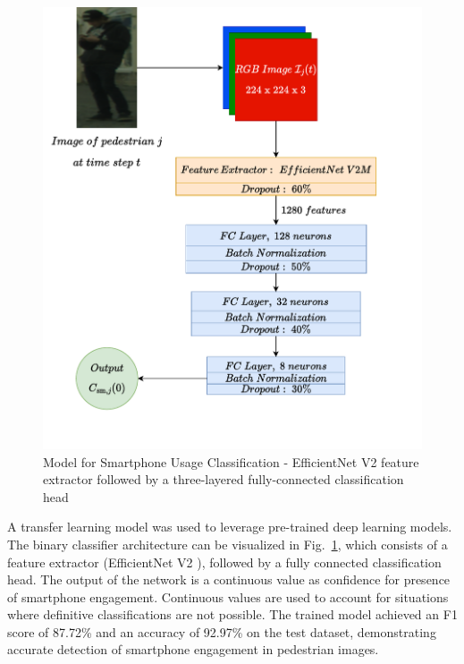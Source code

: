 \documentclass[journal]{IEEEtran}
\begin{document}
\begin{figure}
  \centering
\includegraphics[width=1\columnwidth]{network}
  \caption{Model for Smartphone Usage Classification - EfficientNet V2 feature extractor followed by a three-layered fully-connected classification head}
  \label{network_smato}
\end{figure}
A transfer learning model was used to leverage pre-trained deep learning models. The binary classifier architecture can be visualized in Fig.~\ref{network_smato}, which consists of a feature extractor (EfficientNet V2 \cite{tan2021efficientnetv2}), followed by a fully connected classification head. The output of the network is a continuous value as confidence for presence of smartphone engagement. Continuous values are used to account for situations where definitive classifications are not possible. The trained model achieved an F1 score of 87.72\% and an accuracy of 92.97\% on the test dataset, demonstrating accurate detection of smartphone engagement in pedestrian images.
\end{document}
